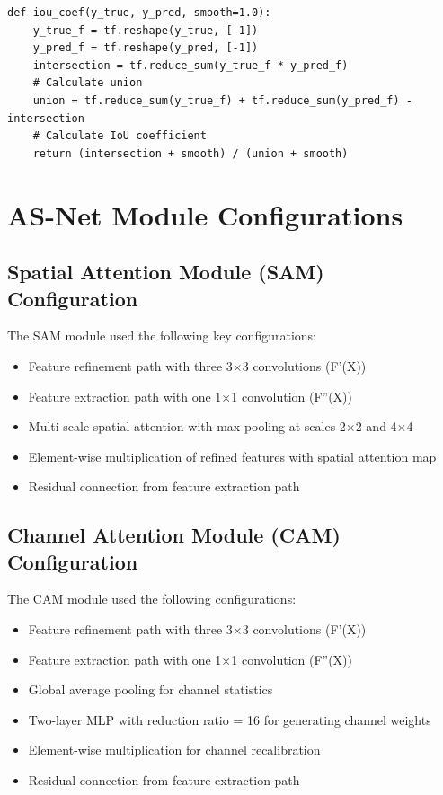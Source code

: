 \begin{theappendices}
\begin{verbatim}
def iou_coef(y_true, y_pred, smooth=1.0):
    y_true_f = tf.reshape(y_true, [-1])
    y_pred_f = tf.reshape(y_pred, [-1])
    intersection = tf.reduce_sum(y_true_f * y_pred_f)
    # Calculate union
    union = tf.reduce_sum(y_true_f) + tf.reduce_sum(y_pred_f) - intersection
    # Calculate IoU coefficient
    return (intersection + smooth) / (union + smooth)
\end{verbatim}

  \chapter{AS-Net Module Configurations}

  \section{Spatial Attention Module (SAM) Configuration}
  The SAM module used the following key configurations:
  \begin{itemize}
    \item Feature refinement path with three 3×3 convolutions (F'(X))
    \item Feature extraction path with one 1×1 convolution (F''(X))
    \item Multi-scale spatial attention with max-pooling at scales 2×2 and 4×4
    \item Element-wise multiplication of refined features with spatial attention map
    \item Residual connection from feature extraction path
  \end{itemize}

  \section{Channel Attention Module (CAM) Configuration}
  The CAM module used the following configurations:
  \begin{itemize}
    \item Feature refinement path with three 3×3 convolutions (F'(X))
    \item Feature extraction path with one 1×1 convolution (F''(X))
    \item Global average pooling for channel statistics
    \item Two-layer MLP with reduction ratio = 16 for generating channel weights
    \item Element-wise multiplication for channel recalibration
    \item Residual connection from feature extraction path
  \end{itemize}


\end{theappendices}
